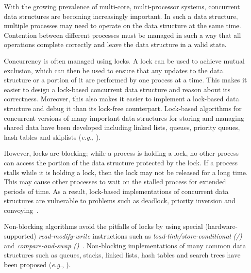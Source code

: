 With the growing prevalence of multi-core, multi-processor systems, concurrent data structures are becoming increasingly important. In such a data structure, multiple processes may need to operate on the data structure at the same time. Contention between different processes must be managed in such a way that all operations complete correctly and leave the data structure in a valid state.

Concurrency is often managed using locks. A lock can be used to achieve mutual exclusion, which can then be used to ensure that any updates to the data structure or a portion of it are performed by one process at a time. This makes it easier to design a lock-based concurrent data structure and reason about its correctness. Moreover, this also makes it easier to implement a lock-based data structure and debug it than its lock-free counterpart. Lock-based algorithms for concurrent versions of many important data structures for storing and managing shared data have been developed including linked lists, queues, priority queues, hash tables and skiplists (\emph{e.g.}, \cite{MicSco:1996:PODC, Mic:2002:SPAA,Lea:2003:JSR166,HelHer+:2005:OPODIS,LevHer+:2007:SIROCCO, HerSha:2012:Book}).

However, locks are blocking; while a process is holding a lock, no other process can access the portion of the data structure protected by the lock. If a process stalls while it is holding a lock, then the lock may not be released for a long time. This may cause other processes to wait on the stalled process for extended periods of time. As a result, lock-based implementations of concurrent data structures are vulnerable to problems such as deadlock, priority inversion and convoying~\cite{HerSha:2012:Book}.

Non-blocking algorithms avoid the pitfalls of locks by using special (hardware-supported) \emph{read-modify-write} instructions such as \emph{load-link/store-conditional (\LL{}/\SC{})}  and \linebreak \emph{compare-and-swap (\CAS{})}~\cite{HerSha:2012:Book}. Non-blocking implementations of many common data structures such as queues, stacks, linked lists, hash tables and search trees  have been proposed (\emph{e.g.}, \cite{Mic:2002:SPAA,FomRup:2004:PODC,BenFin+:2005:SPAA,EllFat+:2010:PODC,HerSha:2012:Book,BraPet:2012:SPAA,HowJon:2012:SPAA,NatMit:2013:DISC,NatSav+:2013:SSS,NatMit:2014:PPoPP,DraVec+:2014:PPoPP,EllFat+:2014:PODC}).

